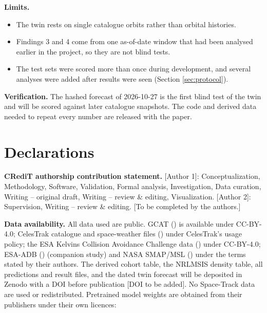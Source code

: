 \documentclass[
]{article}
\providecommand{\tightlist}{%
  \setlength{\itemsep}{0pt}\setlength{\parskip}{0pt}}
\begin{document}
\textbf{Limits.}

\begin{itemize}
\tightlist
\item
  The twin rests on single catalogue orbits rather than orbital
  histories.
\item
  Findings 3 and 4 come from one as-of-date window that had been
  analysed earlier in the project, so they are not blind tests.
\item
  The test sets were scored more than once during development, and
  several analyses were added after results were seen (Section
  \ref{sec:protocol}).
\end{itemize}

\textbf{Verification.} The hashed forecast of 2026-10-27 is the first
blind test of the twin and will be scored against later catalogue
snapshots. The code and derived data needed to repeat every number are
released with the paper.

\section*{Declarations}\label{declarations}

\textbf{CRediT authorship contribution statement.} {[}Author 1{]}:
Conceptualization, Methodology, Software, Validation, Formal analysis,
Investigation, Data curation, Writing -- original draft, Writing --
review \& editing, Visualization. {[}Author 2{]}: Supervision, Writing
-- review \& editing. {[}To be completed by the authors.{]}

\textbf{Data availability.} All data used are public. GCAT
() is available under
CC-BY-4.0; CelesTrak catalogue and space-weather files
() under CelesTrak's
usage policy; the ESA Kelvins Collision Avoidance Challenge data
() under
CC-BY-4.0; ESA-ADB () (companion study) and NASA SMAP/MSL
() under the terms
stated by their authors. The derived cohort table, the NRLMSIS density
table, all predictions and result files, and the dated twin forecast
will be deposited in Zenodo with a DOI before publication {[}DOI to be
added{]}. No Space-Track data are used or redistributed. Pretrained
model weights are obtained from their publishers under their own
licences:
\end{document}
